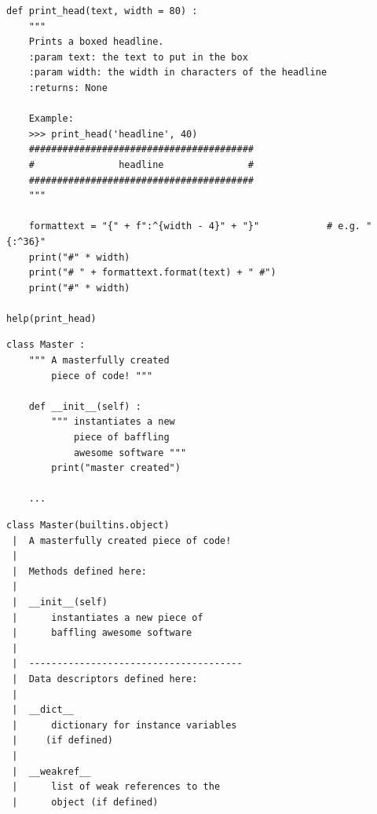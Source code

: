 
\begin{frame}[fragile]
%
\begin{codebox}
\begin{verbatim}
def print_head(text, width = 80) :
    """
    Prints a boxed headline.
    :param text: the text to put in the box
    :param width: the width in characters of the headline
    :returns: None
    
    Example:
    >>> print_head('headline', 40)
    ########################################
    #               headline               #
    ########################################
    """
    
    formattext = "{" + f":^{width - 4}" + "}"            # e.g. "{:^36}"
    print("#" * width)
    print("# " + formattext.format(text) + " #")
    print("#" * width)

help(print_head)
\end{verbatim}
\end{codebox}
%
\end{frame}


\begin{frame}[fragile]
%
\begin{tcbraster}[raster columns=2,
                  raster equal height,
                  nobeforeafter,
                  raster column skip=0.5cm]
\begin{codebox}
\begin{verbatim}
class Master :
    """ A masterfully created
        piece of code! """
    
    def __init__(self) :
        """ instantiates a new
            piece of baffling
            awesome software """
        print("master created")
    
    ...
\end{verbatim}
\end{codebox}
%
\begin{cmdbox}
\begin{verbatim}
class Master(builtins.object)
 |  A masterfully created piece of code!
 |  
 |  Methods defined here:
 |  
 |  __init__(self)
 |      instantiates a new piece of
 |      baffling awesome software
 |  
 |  --------------------------------------
 |  Data descriptors defined here:
 |  
 |  __dict__
 |      dictionary for instance variables
 |     (if defined)
 |  
 |  __weakref__
 |      list of weak references to the
 |      object (if defined)
\end{verbatim}
\end{cmdbox}
\end{tcbraster}
%
\end{frame}

